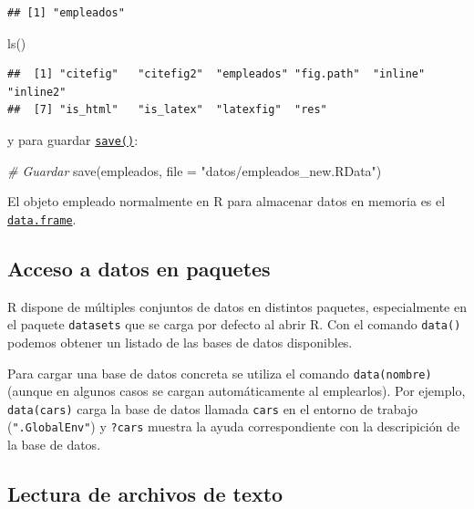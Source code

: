 \documentclass[
]{book}
\newenvironment{Shaded}{\begin{snugshade}}{\end{snugshade}}
\newcommand{\AttributeTok}[1]{\textcolor[rgb]{0.77,0.63,0.00}{#1}}
\newcommand{\CommentTok}[1]{\textcolor[rgb]{0.56,0.35,0.01}{\textit{#1}}}
\newcommand{\FunctionTok}[1]{\textcolor[rgb]{0.00,0.00,0.00}{#1}}
\newcommand{\NormalTok}[1]{#1}
\newcommand{\StringTok}[1]{\textcolor[rgb]{0.31,0.60,0.02}{#1}}
\theoremstyle{break}
\begin{document}
\begin{verbatim}
## [1] "empleados"
\end{verbatim}

\begin{Shaded}
\begin{Highlighting}[]
\FunctionTok{ls}\NormalTok{()}
\end{Highlighting}
\end{Shaded}

\begin{verbatim}
##  [1] "citefig"   "citefig2"  "empleados" "fig.path"  "inline"    "inline2"  
##  [7] "is_html"   "is_latex"  "latexfig"  "res"
\end{verbatim}

y para guardar \href{https://www.rdocumentation.org/packages/base/versions/3.6.1/topics/save}{\texttt{save()}}:

\begin{Shaded}
\begin{Highlighting}[]
\CommentTok{\# Guardar}
\FunctionTok{save}\NormalTok{(empleados, }\AttributeTok{file =} \StringTok{"datos/empleados\_new.RData"}\NormalTok{)}
\end{Highlighting}
\end{Shaded}

El objeto empleado normalmente en R para almacenar datos en memoria
es el \href{https://www.rdocumentation.org/packages/base/versions/3.6.1/topics/data.frame}{\texttt{data.frame}}.

\hypertarget{acceso-a-datos-en-paquetes}{%
\subsection{Acceso a datos en paquetes}\label{acceso-a-datos-en-paquetes}}

R dispone de múltiples conjuntos de datos en distintos paquetes, especialmente en el paquete \texttt{datasets}
que se carga por defecto al abrir R.
Con el comando \texttt{data()} podemos obtener un listado de las bases de datos disponibles.

Para cargar una base de datos concreta se utiliza el comando
\texttt{data(nombre)} (aunque en algunos casos se cargan automáticamente al emplearlos).
Por ejemplo, \texttt{data(cars)} carga la base de datos llamada \texttt{cars} en el entorno de trabajo (\texttt{".GlobalEnv"})
y \texttt{?cars} muestra la ayuda correspondiente con la descripición de la base de datos.

\hypertarget{cap4-texto}{%
\subsection{Lectura de archivos de texto}\label{cap4-texto}}
\end{document}
